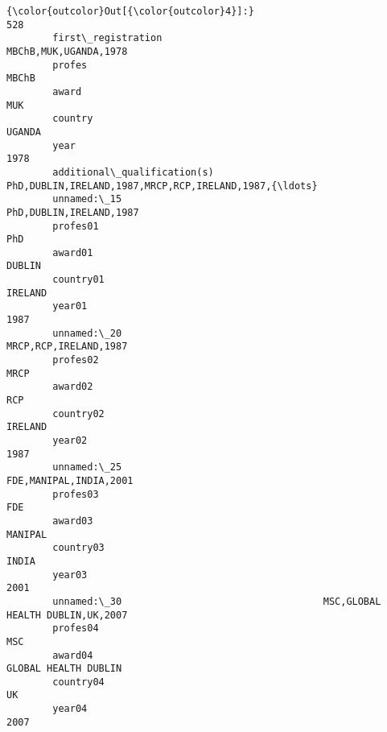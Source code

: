\documentclass[11pt]{article}
\begin{document}
\begin{Verbatim}[commandchars=\\\{\}]
{\color{outcolor}Out[{\color{outcolor}4}]:}                                                                            528
        first\_registration                                       MBChB,MUK,UGANDA,1978
        profes                                                                   MBChB
        award                                                                      MUK
        country                                                                 UGANDA
        year                                                                      1978
        additional\_qualification(s)  PhD,DUBLIN,IRELAND,1987,MRCP,RCP,IRELAND,1987,{\ldots}
        unnamed:\_15                                            PhD,DUBLIN,IRELAND,1987
        profes01                                                                   PhD
        award01                                                                 DUBLIN
        country01                                                              IRELAND
        year01                                                                    1987
        unnamed:\_20                                              MRCP,RCP,IRELAND,1987
        profes02                                                                  MRCP
        award02                                                                    RCP
        country02                                                              IRELAND
        year02                                                                    1987
        unnamed:\_25                                             FDE,MANIPAL,INDIA,2001
        profes03                                                                   FDE
        award03                                                                MANIPAL
        country03                                                                INDIA
        year03                                                                    2001
        unnamed:\_30                                   MSC,GLOBAL HEALTH DUBLIN,UK,2007
        profes04                                                                   MSC
        award04                                                   GLOBAL HEALTH DUBLIN
        country04                                                                   UK
        year04                                                                    2007
\end{Verbatim}
            
\end{document}
